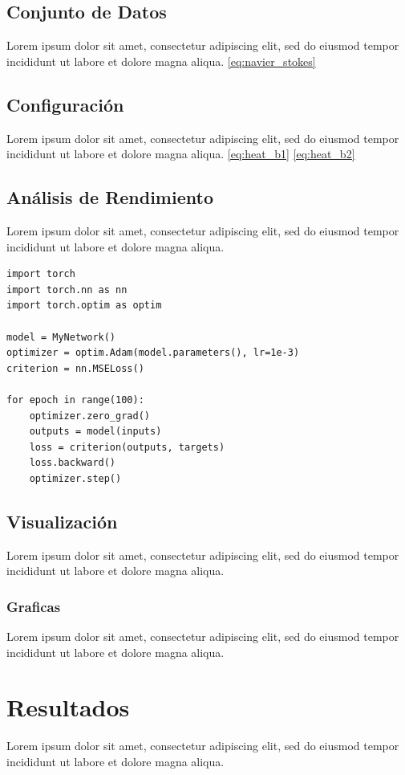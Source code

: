 \documentclass[12pt]{extarticle}
\numberwithin{equation}{section}
\begin{document}
\subsection{Conjunto de Datos}
Lorem ipsum dolor sit amet, consectetur adipiscing elit, sed do eiusmod tempor incididunt ut labore et dolore magna aliqua. \eqref{eq:navier_stokes} %

\subsection{Configuración}
Lorem ipsum dolor sit amet, consectetur adipiscing elit, sed do eiusmod tempor incididunt ut labore et dolore magna aliqua. \eqref{eq:heat_b1} \eqref{eq:heat_b2}

\subsection{Análisis de Rendimiento}
Lorem ipsum dolor sit amet, consectetur adipiscing elit, sed do eiusmod tempor incididunt ut labore et dolore magna aliqua. 

\begin{lstlisting}[caption={Entrenamiento de la red con Adam}, label={code:adam}]
import torch
import torch.nn as nn
import torch.optim as optim

model = MyNetwork()
optimizer = optim.Adam(model.parameters(), lr=1e-3)
criterion = nn.MSELoss()

for epoch in range(100):
    optimizer.zero_grad()
    outputs = model(inputs)
    loss = criterion(outputs, targets)
    loss.backward()
    optimizer.step()

\end{lstlisting}


\subsection{Visualización}
Lorem ipsum dolor sit amet, consectetur adipiscing elit, sed do eiusmod tempor incididunt ut labore et dolore magna aliqua.

\subsubsection{Graficas}
Lorem ipsum dolor sit amet, consectetur adipiscing elit, sed do eiusmod tempor incididunt ut labore et dolore magna aliqua.

\section{Resultados}
Lorem ipsum dolor sit amet, consectetur adipiscing elit, sed do eiusmod tempor incididunt ut labore et dolore magna aliqua.
\end{document}
